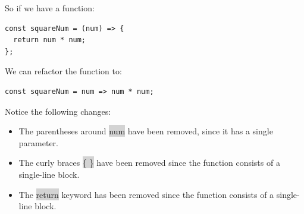 \documentclass[11pt]{article}
\begin{document}
So if we have a function: 
\begin{lstlisting}
const squareNum = (num) => {
  return num * num;
};
\end{lstlisting}
We can refactor the function to:
\begin{lstlisting}
const squareNum = num => num * num;
\end{lstlisting}
Notice the following changes:
\begin{itemize}[leftmargin = *]
\item The parentheses around \colorbox{lightgray}{num} have been removed, since it has a single parameter.
\item The curly braces \colorbox{lightgray}{\{ \}} have been removed since the function consists of a single-line block.
\item The \colorbox{lightgray}{return} keyword has been removed since the function consists of a single-line block.
\end{itemize}
\end{document}
